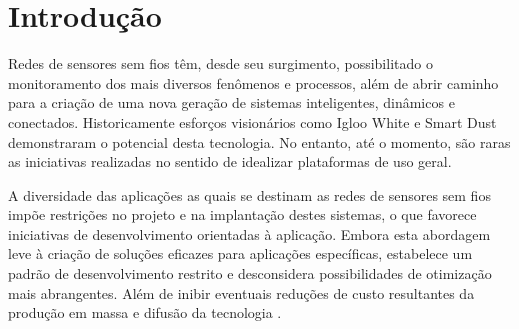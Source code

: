 \documentclass[
	12pt,				%
	openright,			%
	oneside,
	a4paper,			%
	english,			%
	french,				%
	spanish,			%
	brazil				%
	]{abntex2}
\begin{document}
\listoffigures*
\cleardoublepage

\listoftables*
\cleardoublepage



\tableofcontents*
\cleardoublepage



\textual

\chapter[Introdução]{Introdução}
Redes de sensores sem fios têm, desde seu surgimento, possibilitado o monitoramento dos mais diversos fenômenos e processos, além de abrir caminho para a criação de uma nova geração de sistemas inteligentes, dinâmicos e conectados. Historicamente esforços visionários como Igloo White \cite{Warneke2001} e Smart Dust \cite{Correl2004} demonstraram o potencial desta tecnologia. No entanto, até o momento, são raras as iniciativas realizadas no sentido de idealizar plataformas de uso geral.

A diversidade das aplicações as quais se destinam as redes de sensores sem fios impõe restrições no projeto e na implantação destes sistemas, o que favorece iniciativas de desenvolvimento orientadas à aplicação. Embora esta abordagem leve à criação de soluções eficazes para aplicações específicas, estabelece um padrão de desenvolvimento restrito e desconsidera possibilidades de otimização mais abrangentes. Além de inibir eventuais reduções de custo resultantes da produção em massa e difusão da tecnologia \cite{Rawat2014}. 
\end{document}
